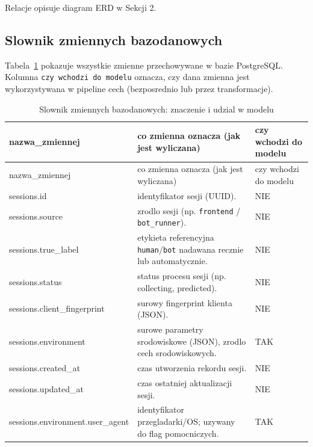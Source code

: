 Relacje opisuje diagram ERD w Sekcji 2.

\subsection{Slownik zmiennych bazodanowych}
Tabela~\ref{tab:db-variable-dictionary} pokazuje wszystkie zmienne przechowywane
w bazie PostgreSQL. Kolumna \texttt{czy wchodzi do modelu} oznacza, czy dana
zmienna jest wykorzystywana w pipeline cech (bezposrednio lub przez transformacje).

\begin{longtable}{
  >{\ttfamily\scriptsize\raggedright\arraybackslash\hspace{0pt}}p{}
  @{\hspace{1.0em}}
  >{\footnotesize\raggedright\arraybackslash}p{}
  @{\hspace{0.8em}}
  >{\footnotesize\centering\arraybackslash}p{}
}
\caption{Slownik zmiennych bazodanowych: znaczenie i udzial w modelu}
\label{tab:db-variable-dictionary} \\
\toprule
\textnormal{nazwa\_zmiennej} & \textnormal{co zmienna oznacza (jak jest wyliczana)} & \textnormal{czy wchodzi do modelu} \\
\midrule
\endfirsthead
\toprule
\textnormal{nazwa\_zmiennej} & \textnormal{co zmienna oznacza (jak jest wyliczana)} & \textnormal{czy wchodzi do modelu} \\
\midrule
\endhead
\textnormal{sessions.id} & identyfikator sesji (UUID). & NIE \\
\textnormal{sessions.source} & zrodlo sesji (np. \texttt{frontend} / \texttt{bot\_runner}). & NIE \\
\textnormal{sessions.true\_label} & etykieta referencyjna \texttt{human}/\texttt{bot} nadawana recznie lub automatycznie. & NIE \\
\textnormal{sessions.status} & status procesu sesji (np. collecting, predicted). & NIE \\
\textnormal{sessions.client\_fingerprint} & surowy fingerprint klienta (JSON). & NIE \\
\textnormal{sessions.environment} & surowe parametry srodowiskowe (JSON), zrodlo cech srodowiskowych. & TAK \\
\textnormal{sessions.created\_at} & czas utworzenia rekordu sesji. & NIE \\
\textnormal{sessions.updated\_at} & czas ostatniej aktualizacji sesji. & NIE \\
\textnormal{sessions.environment.user\_agent} & identyfikator przegladarki/OS; uzywany do flag pomocniczych. & TAK \\

\end{longtable}
